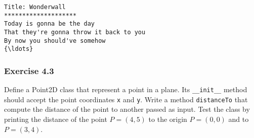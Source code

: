\documentclass[11pt]{article}
\begin{document}
    \begin{Verbatim}[commandchars=\\\{\}]
Title: Wonderwall
********************
Today is gonna be the day
That they're gonna throw it back to you
By now you should've somehow
{\ldots}

    \end{Verbatim}

    \hypertarget{exercise-4.3}{%
\subsubsection{Exercise 4.3}\label{exercise-4.3}}

Define a Point2D class that represent a point in a plane. Its
\texttt{\_\_init\_\_} method should accept the point coordinates
\texttt{x} and \texttt{y}. Write a method \texttt{distanceTo} that
compute the distance of the point to another passed as input. Test the
class by printing the distance of the point \(P=(4, 5)\) to the origin
\(P=(0,0)\) and to \(P=(3,4)\).
\end{document}
